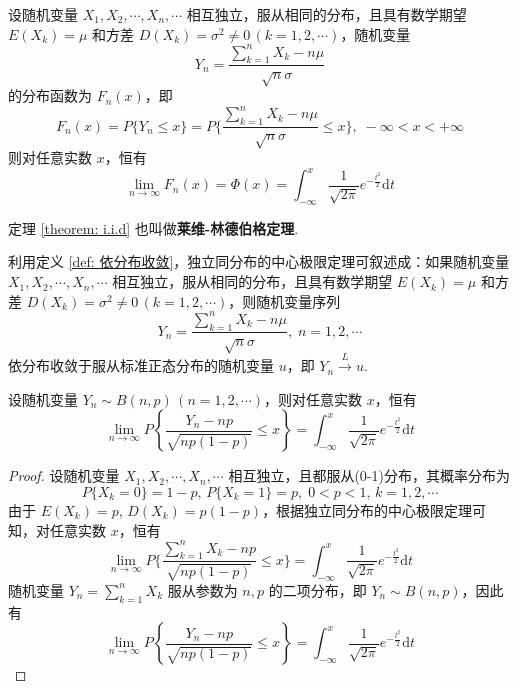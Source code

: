 \begin{theorem}[][独立同分布的中心极限定理] \label{theorem: i.i.d}
    设随机变量 $X_1,X_2,\cdots,X_n,\cdots$ 相互独立，服从相同的分布，且具有数学期望 $E(X_k) = \mu$ 和方差 $D(X_k) = \sigma^2 \not= 0 \, (k=1,2,\cdots)$，随机变量
    $$
    Y_n = \dfrac{\displaystyle\sum_{k=1}^n X_k - n \mu}{\sqrt{n} \sigma}
    $$
    的分布函数为 $F_n(x)$，即
    $$
    F_n(x) = P \{ Y_n \leqslant x \} = P \Bigg\{ \dfrac{\displaystyle\sum_{k=1}^n X_k - n \mu}{\sqrt{n} \sigma} \leqslant x \Bigg\}, \; -\infty < x < +\infty
    $$
    则对任意实数 $x$，恒有
    $$
    \lim_{n \to \infty} F_n(x) = \varPhi(x) = \int_{-\infty}^x \dfrac{1}{\sqrt{2\pi}} e^{-\frac{t^2}{2}} \text{d}t
    $$
\end{theorem}

定理 \ref{theorem: i.i.d} 也叫做\textbf{莱维-林德伯格定理}.

利用定义 \ref{def: 依分布收敛}，独立同分布的中心极限定理可叙述成：如果随机变量 $X_1,X_2,\cdots,X_n,\cdots$ 相互独立，服从相同的分布，且具有数学期望 $E(X_k) = \mu$ 和方差 $D(X_k) = \sigma^2 \not= 0 \, (k=1,2,\cdots)$，则随机变量序列
$$
Y_n = \dfrac{\displaystyle\sum_{k=1}^n X_k - n \mu}{\sqrt{n} \sigma}, \; n=1,2,\cdots
$$
依分布收敛于服从标准正态分布的随机变量 $u$，即 $Y_n \overset{L}{\longrightarrow} u$.

\begin{theorem} \label{theorem: 棣莫弗-拉普拉斯极限定理}
    设随机变量 $Y_n \sim B(n,p) \, (n=1,2,\cdots)$，则对任意实数 $x$，恒有
    $$
    \lim_{n \to \infty} P \left\{ \dfrac{Y_n - np}{\sqrt{np(1-p)}} \leqslant x \right\} = \int_{-\infty}^x \dfrac{1}{\sqrt{2\pi}} e^{-\frac{t^2}{2}} \text{d}t
    $$
\end{theorem}

\begin{proof}
    设随机变量 $X_1,X_2,\cdots,X_n,\cdots$ 相互独立，且都服从(0-1)分布，其概率分布为
    $$
    P \{ X_k=0 \} = 1-p, \, P \{ X_k=1 \} = p, \; 0 < p < 1, \, k=1,2,\cdots
    $$
    由于 $E(X_k) = p, \, D(X_k) = p(1-p)$，根据独立同分布的中心极限定理可知，对任意实数 $x$，恒有
    $$
    \lim_{n \to \infty} P \Bigg\{ \dfrac{\displaystyle\sum_{k=1}^n X_k - np}{\sqrt{np(1-p)}} \leqslant x \Bigg\} = \int_{-\infty}^x \dfrac{1}{\sqrt{2\pi}} e^{-\frac{t^2}{2}} \text{d}t
    $$
    随机变量 $Y_n = \displaystyle\sum_{k=1}^n X_k$ 服从参数为 $n,p$ 的二项分布，即 $Y_n \sim B(n,p)$，因此有
    $$
    \lim_{n \to \infty} P \left\{ \dfrac{Y_n - np}{\sqrt{np(1-p)}} \leqslant x \right\} = \int_{-\infty}^x \dfrac{1}{\sqrt{2\pi}} e^{-\frac{t^2}{2}} \text{d}t
    $$
\end{proof}

